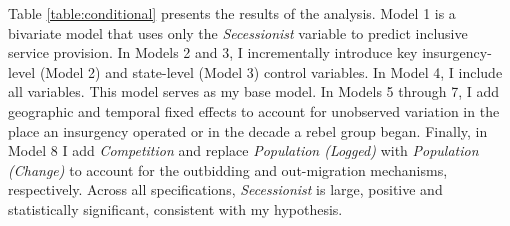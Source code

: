 \documentclass[12pt, letterpaper]{article}
\begin{document}
Table \ref{table:conditional} presents the results of the analysis. Model 1 is a bivariate model that uses only the \textit{Secessionist} variable to predict inclusive service provision. In Models 2 and 3, I incrementally introduce key insurgency-level (Model 2) and state-level (Model 3) control variables. In Model 4, I include all variables. This model serves as my base model. In Models 5 through 7, I add geographic and temporal fixed effects to account for unobserved variation in the place an insurgency operated or in the decade a rebel group began. Finally, in Model 8 I add \textit{Competition} and replace \textit{Population (Logged)} with \textit{Population (Change)} to account for the outbidding and out-migration mechanisms, respectively. Across all specifications, \textit{Secessionist} is large, positive and statistically significant, consistent with my hypothesis. %
\end{document}
